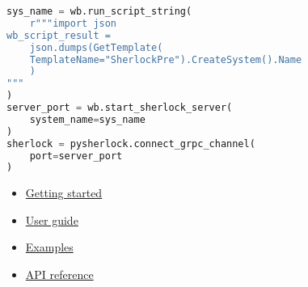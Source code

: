\documentclass[
  9pt,
  landscape]{article}
\providecommand{\tightlist}{%
  \setlength{\itemsep}{0pt}\setlength{\parskip}{0pt}}\usepackage{longtable,booktabs,array}
\begin{document}
\begin{multicols}{3}
\begin{lstlisting}[language=Python]
sys_name = wb.run_script_string(
    r"""import json
wb_script_result =
    json.dumps(GetTemplate(
    TemplateName="SherlockPre").CreateSystem().Name
    )
"""
)
server_port = wb.start_sherlock_server(
    system_name=sys_name
)
sherlock = pysherlock.connect_grpc_channel(
    port=server_port
)
\end{lstlisting}

\begin{itemize}
\tightlist
\item
  \href{https://workbench.docs.pyansys.com/version/stable/getting-started.html}{Getting
  started}
\item
  \href{https://workbench.docs.pyansys.com/version/stable/user-guide.html}{User
  guide}
\item
  \href{https://workbench.docs.pyansys.com/version/stable/examples.html}{Examples}
\item
  \href{https://workbench.docs.pyansys.com/version/stable/api/index.html}{API
  reference}
\end{itemize}



%
%
%
%

\end{multicols}
\end{document}
